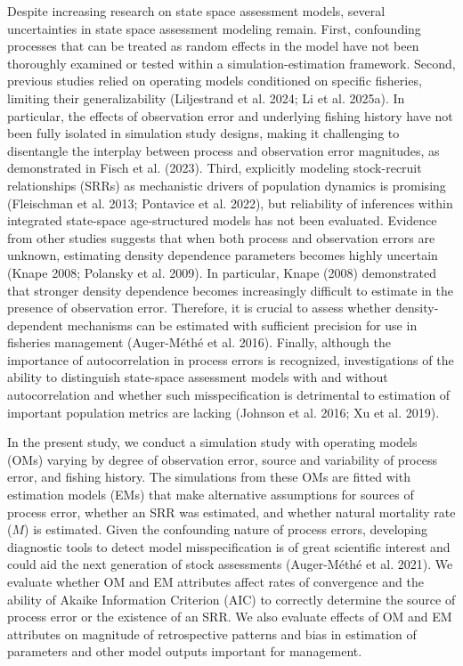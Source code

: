 \documentclass[
  12pt,
]{article}
\begin{document}
Despite increasing research on state space assessment models, several
uncertainties in state space assessment modeling remain. First,
confounding processes that can be treated as random effects in the model
have not been thoroughly examined or tested within a
simulation-estimation framework. Second, previous studies relied on
operating models conditioned on specific fisheries, limiting their
generalizability (Liljestrand et al. 2024; Li et al. 2025a). In
particular, the effects of observation error and underlying fishing
history have not been fully isolated in simulation study designs, making
it challenging to disentangle the interplay between process and
observation error magnitudes, as demonstrated in Fisch et al. (2023).
Third, explicitly modeling stock-recruit relationships (SRRs) as
mechanistic drivers of population dynamics is promising (Fleischman et
al. 2013; Pontavice et al. 2022), but reliability of inferences within
integrated state-space age-structured models has not been evaluated.
Evidence from other studies suggests that when both process and
observation errors are unknown, estimating density dependence parameters
becomes highly uncertain (Knape 2008; Polansky et al. 2009). In
particular, Knape (2008) demonstrated that stronger density dependence
becomes increasingly difficult to estimate in the presence of
observation error. Therefore, it is crucial to assess whether
density-dependent mechanisms can be estimated with sufficient precision
for use in fisheries management (Auger-Méthé et al. 2016). Finally,
although the importance of autocorrelation in process errors is
recognized, investigations of the ability to distinguish state-space
assessment models with and without autocorrelation and whether such
misspecification is detrimental to estimation of important population
metrics are lacking (Johnson et al. 2016; Xu et al. 2019).

In the present study, we conduct a simulation study with operating
models (OMs) varying by degree of observation error, source and
variability of process error, and fishing history. The simulations from
these OMs are fitted with estimation models (EMs) that make alternative
assumptions for sources of process error, whether an SRR was estimated,
and whether natural mortality rate (\(M\)) is estimated. Given the
confounding nature of process errors, developing diagnostic tools to
detect model misspecification is of great scientific interest and could
aid the next generation of stock assessments ({Auger-Méthé et al.}
2021). We evaluate whether OM and EM attributes affect rates of
convergence and the ability of Akaike Information Criterion (AIC) to
correctly determine the source of process error or the existence of an
SRR. We also evaluate effects of OM and EM attributes on magnitude of
retrospective patterns and bias in estimation of parameters and other
model outputs important for management.
\end{document}
